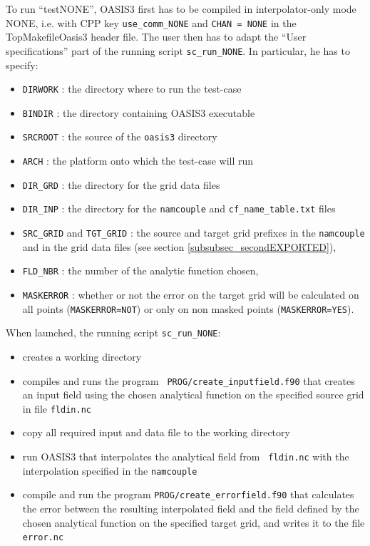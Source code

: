 To run ``testNONE'', OASIS3 first has to be compiled in
interpolator-only mode NONE, i.e. with CPP key {\tt use\_comm\_NONE} and 
{\tt CHAN = NONE} in the TopMakefileOasis3 header file. The user then has to adapt the ``User specifications''
part of the running script {\tt sc\_run\_NONE}. In particular, he has
to specify:
\begin{itemize}
\item {\tt DIRWORK} : the directory where to run the test-case
\item {\tt BINDIR} : the directory containing OASIS3 executable
\item {\tt SRCROOT} : the source of the {\tt oasis3} directory
\item {\tt ARCH} : the platform onto which the test-case will run
\item {\tt DIR\_GRD} : the directory for the grid data files
\item {\tt DIR\_INP} : the directory for the {\tt namcouple} and {\tt cf\_name\_table.txt} files  
\item {\tt SRC\_GRID} and {\tt TGT\_GRID} : the source
and target grid prefixes in the {\tt namcouple} and in the grid data
files (see section \ref{subsubsec_secondEXPORTED}), 
\item {\tt FLD\_NBR} : the number of the analytic function chosen, 
\item {\tt MASKERROR} : whether or not the error on the target grid will be
calculated on all points ({\tt MASKERROR=NOT}) or only on non masked
points ({\tt MASKERROR=YES}).
\end{itemize}

When launched, the running script {\tt sc\_run\_NONE}:
\begin{itemize}
\item creates a working directory
\item compiles and runs the program {\tt
    PROG/create\_inputfield.f90} that creates an input field using the
  chosen analytical function on the specified source grid in file
  {\tt fldin.nc}
\item copy all required input and data file to the working directory 
\item run OASIS3 that interpolates the analytical field from {\tt
    fldin.nc} with the interpolation specified in the {\tt namcouple}
\item compile and run the program {\tt PROG/create\_errorfield.f90}
  that calculates the error between the resulting interpolated field
  and the field defined by the chosen analytical function on the
  specified target grid, and writes it to the file {\tt error.nc}
\end{itemize}

